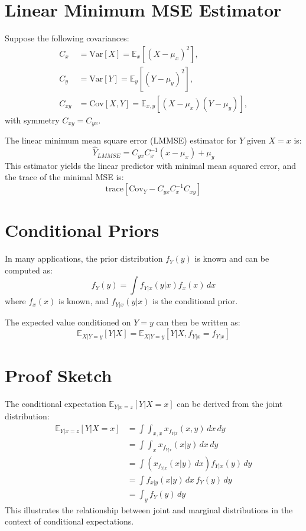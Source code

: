 \documentclass[a4paper, 11pt]{article}
\begin{document}
\section{Linear Minimum MSE Estimator}

Suppose the following covariances:
\begin{align}
C_x &= \mathrm{Var}[X] = \mathbb{E}_x \left[ (X - \mu_x)^2 \right], \\
C_y &= \mathrm{Var}[Y] = \mathbb{E}_y \left[ (Y - \mu_y)^2 \right], \\
C_{xy} &= \mathrm{Cov}[X, Y] = \mathbb{E}_{x,y} \left[ (X - \mu_x)(Y - \mu_y) \right],
\end{align}
with symmetry \( C_{xy} = C_{yx} \).

The linear minimum mean square error (LMMSE) estimator for \( Y \) given \( X = x \) is:
\begin{equation}
\boxed{
\hat{Y}_{LMMSE} = C_{yx} C_x^{-1} (x - \mu_x) + \mu_y
}
\end{equation}
This estimator yields the linear predictor with minimal mean squared error, and the trace of the minimal MSE is:
\begin{equation}
\mathrm{trace} \left[ \mathrm{Cov}_Y - C_{yx} C_x^{-1} C_{xy} \right]
\end{equation}

\section{Conditional Priors}

In many applications, the prior distribution \( f_Y(y) \) is known and can be computed as:
\begin{equation}
f_Y(y) = \int f_{Y|x}(y|x) f_x(x) \, dx
\end{equation}
where \( f_x(x) \) is known, and \( f_{Y|x}(y|x) \) is the conditional prior.

The expected value conditioned on \( Y = y \) can then be written as:
\begin{equation}
\mathbb{E}_{X|Y=y} [ Y | X ] = \mathbb{E}_{X|Y=y} [ Y | X, f_{Y|x} = f_{Y|x} ]
\end{equation}

\section{Proof Sketch}

The conditional expectation \( \mathbb{E}_{Y|x=z}[Y|X=x] \) can be derived from the joint distribution:
\begin{align}
\mathbb{E}_{Y|x=z}[Y|X=x] &= \int \int_{x,x} x_{f_{Y|x}}(x, y) \, dx \, dy \\
&= \int \int_{x} x_{f_{Y|x}}(x|y) \, dx \, dy \\
&= \int \left( x_{f_{Y|x}}(x|y) \, dx \right) f_{Y|x}(y) \, dy \\
&= \int f_{x|y}(x|y) \, dx \, f_{Y}(y) \, dy \\
&= \int_{y} f_Y(y) \, dy
\end{align}
This illustrates the relationship between joint and marginal distributions in the context of conditional expectations.
\end{document}
